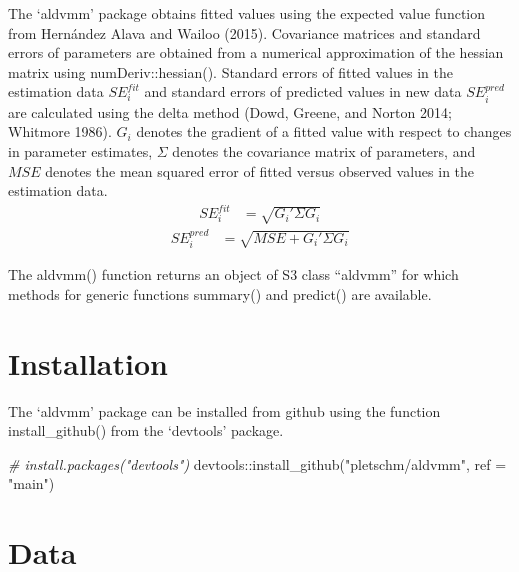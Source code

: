 \documentclass[
]{article}
\newenvironment{Shaded}{\begin{snugshade}}{\end{snugshade}}
\newcommand{\AttributeTok}[1]{\textcolor[rgb]{0.77,0.63,0.00}{#1}}
\newcommand{\CommentTok}[1]{\textcolor[rgb]{0.56,0.35,0.01}{\textit{#1}}}
\newcommand{\FunctionTok}[1]{\textcolor[rgb]{0.00,0.00,0.00}{#1}}
\newcommand{\NormalTok}[1]{#1}
\newcommand{\SpecialCharTok}[1]{\textcolor[rgb]{0.00,0.00,0.00}{#1}}
\newcommand{\StringTok}[1]{\textcolor[rgb]{0.31,0.60,0.02}{#1}}
\begin{document}
The `aldvmm' package obtains fitted values using the expected value function from Hernández Alava and Wailoo (2015). Covariance matrices and standard errors of parameters are obtained from a numerical approximation of the hessian matrix using numDeriv::hessian(). Standard errors of fitted values in the estimation data \(SE^{fit}_{i}\) and standard errors of predicted values in new data \(SE^{pred}_{i}\) are calculated using the delta method (Dowd, Greene, and Norton 2014; Whitmore 1986). \(G_{i}\) denotes the gradient of a fitted value with respect to changes in parameter estimates, \(\Sigma\) denotes the covariance matrix of parameters, and \(MSE\) denotes the mean squared error of fitted versus observed values in the estimation data.
\begin{equation}
\begin{array}{rl}
SE^{fit}_{i} &= \sqrt{G_{i}'\Sigma G_{i}}
\end{array}
\end{equation}
\begin{equation}
\begin{array}{rl}
SE^{pred}_{i} &= \sqrt{MSE + G_{i}'\Sigma G_{i}}
\end{array}
\end{equation}

The aldvmm() function returns an object of S3 class ``aldvmm'' for which methods for generic functions summary() and predict() are available.

\hypertarget{installation}{%
\section{Installation}\label{installation}}

The `aldvmm' package can be installed from github using the function install\_github() from the `devtools' package.

\begin{Shaded}
\begin{Highlighting}[]
\CommentTok{\# install.packages("devtools")}
\NormalTok{devtools}\SpecialCharTok{::}\FunctionTok{install\_github}\NormalTok{(}\StringTok{"pletschm/aldvmm"}\NormalTok{, }\AttributeTok{ref =} \StringTok{"main"}\NormalTok{)}
\end{Highlighting}
\end{Shaded}

\hypertarget{data}{%
\section{Data}\label{data}}
\end{document}
